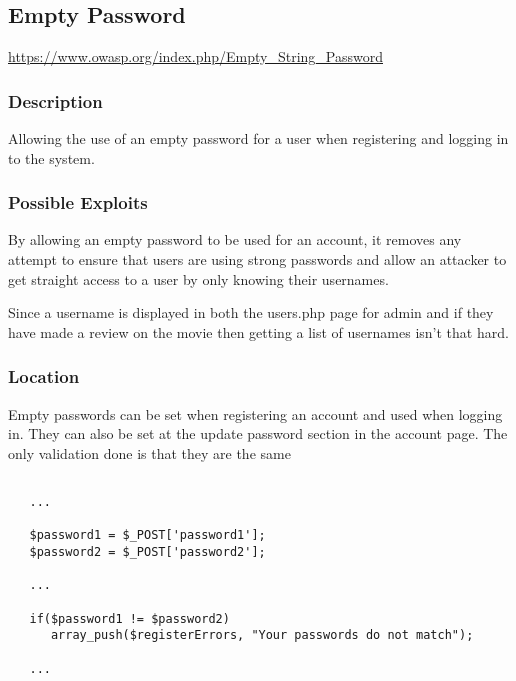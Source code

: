 \documentclass[titlepage]{article}
\begin{document}
   \subsection{Empty Password} %
   \label{sub:empty_password}

      \url{https://www.owasp.org/index.php/Empty_String_Password}
   
      \subsubsection{Description} %
      \label{ssub:empty_password_description}
      
      Allowing the use of an empty password for a user when registering and logging in to the system. 


      \subsubsection{Possible Exploits} %
      \label{ssub:empty_password_possible_exploits}
      
      By allowing an empty password to be used for an account, it removes any attempt to ensure that users are using strong passwords and allow an attacker to get straight access to a user by only knowing their usernames. 

      Since a username is displayed in both the users.php page for admin and if they have made a review on the movie then getting a list of usernames isn't that hard.


      \subsubsection{Location} %
      \label{ssub:empty_password_location}
      
      Empty passwords can be set when registering an account and used when logging in. They can also be set at the update password section in the account page. The only validation done is that they are the same

      \begin{lstlisting}

   ...

   $password1 = $_POST['password1'];
   $password2 = $_POST['password2'];

   ...

   if($password1 != $password2)
      array_push($registerErrors, "Your passwords do not match");

   ...

      \end{lstlisting}
\end{document}

